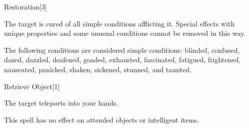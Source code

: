 \begin{spellsection}{Restoration}[3]
    \begin{spellheader}
    \end{spellheader}
    \begin{spellcontent}
        \begin{spelltargetinginfo}
        \end{spelltargetinginfo}
        \begin{spelleffects}
            \spelleffect The target is cured of all simple conditions afflicting it. Special effects with unique properties and some unusual conditions cannot be removed in this way.
        \end{spelleffects}
    \end{spellcontent}
    \begin{spellfooter}
        \spellnotes The following conditions are considered simple conditions: blinded, confused, dazed, dazzled, deafened, goaded, exhausted, fascinated, fatigued, frightened, nauseated, panicked, shaken, sickened, stunned, and taunted.
        \miscastexplode
    \end{spellfooter}
\end{spellsection}

\begin{spellsection}{Retrieve Object}[1]
    \begin{spellheader}
    \end{spellheader}
    \begin{spellcontent}
        \begin{spelltargetinginfo}
        \end{spelltargetinginfo}
        \begin{spelleffects}
            \spelleffect The target teleports into your hands.
        \end{spelleffects}
    \end{spellcontent}
    \begin{spellfooter}
        \spellnotes This spell has no effect on attended objects or intelligent items.
        \miscastrandom
    \end{spellfooter}
    \begin{spellaugments}
    \end{spellaugments}
\end{spellsection}

